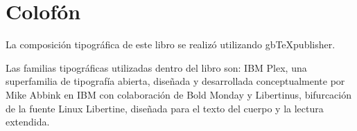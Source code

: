 \chapter*{Colofón}
\justifying

La composición tipográfica de este libro se realizó utilizando gbTeXpublisher.

Las familias tipográficas utilizadas dentro del libro son: IBM Plex, una superfamilia de tipografía abierta, diseñada y desarrollada conceptualmente por Mike Abbink en IBM con colaboración de Bold Monday y Libertinus, bifurcación de la fuente Linux Libertine, diseñada para el texto del cuerpo y la lectura extendida.
